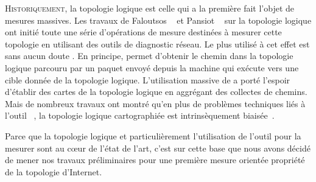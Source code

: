 \label{chap:traceroute}
\introformatting

\lettrine{H}{istoriquement}, la topologie logique est celle qui a la première
fait l'objet de mesures massives. Les travaux de Faloutsos
\etal~\cite{FaloutsosFF99} et Pansiot \etal~\cite{280555} sur la topologie
logique ont initié toute une série d'opérations de mesure destinées à mesurer
cette topologie en utilisant des outils de diagnostic réseau. Le plus utilisé à
cet effet est sans aucun doute \traceroute. En principe, \traceroute permet
d'obtenir le chemin dans la topologie logique parcouru par un paquet envoyé
depuis la machine qui exécute \traceroute vers une cible donnée de la topologie
logique. L'utilisation massive de \traceroute a porté l'espoir d'établir des
cartes de la topologie logique en aggrégant des collectes de chemins. Mais de
nombreux travaux ont montré qu'en plus de problèmes techniques liés à l'outil
\traceroute~\cite{paristraceroute,pansiot2012,roughan201110}, la topologie
logique cartographiée est intrinsèquement
biaisée~\cite{LakhinaBCX03,AchlioptasCKM09,willinger,MDBP10,DallAstaABVV06,GuillaumeLM06,LatapyM08,roughan201110}.

Parce que la topologie logique et particulièrement l'utilisation de l'outil
\traceroute pour la mesurer sont au cœur de l'état de l'art, c'est sur cette
base que nous avons décidé de mener nos travaux préliminaires pour une première
mesure orientée propriété de la topologie d'Internet.

